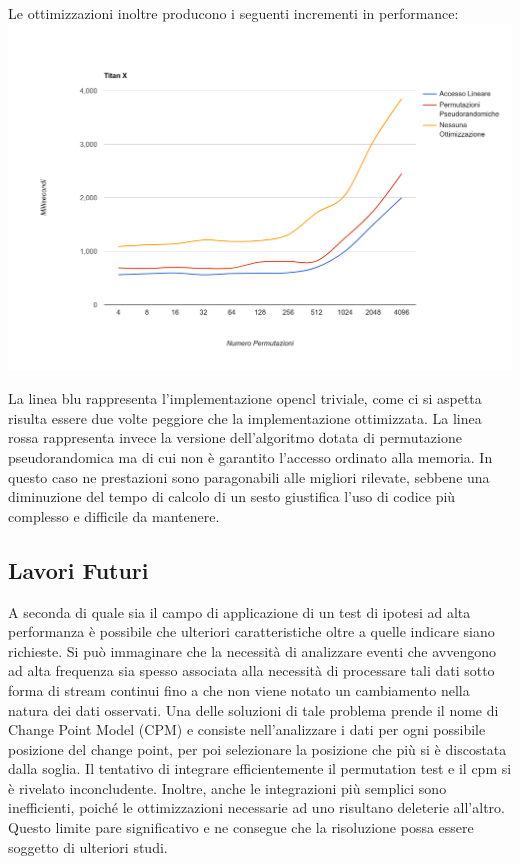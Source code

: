 Le ottimizzazioni inoltre producono i seguenti incrementi in performance:
\includegraphics[width=\linewidth]{ott}

La linea blu rappresenta l'implementazione opencl triviale, come ci si aspetta risulta essere due volte peggiore che la implementazione ottimizzata. La linea rossa rappresenta invece la versione dell'algoritmo dotata di permutazione pseudorandomica ma di cui non è garantito l'accesso ordinato alla memoria. In questo caso ne prestazioni sono paragonabili alle migliori rilevate, sebbene una diminuzione del tempo di calcolo di un sesto giustifica l'uso di codice più complesso e difficile da mantenere.

\subsection{Lavori Futuri}
A seconda di quale sia il campo di applicazione di un test di ipotesi ad alta performanza è possibile che ulteriori caratteristiche oltre a quelle indicare siano richieste. Si può immaginare che la necessità di analizzare eventi che avvengono ad alta frequenza sia spesso associata alla necessità di processare tali dati sotto forma di stream continui fino a che non viene notato un cambiamento nella natura dei dati osservati.
Una delle soluzioni di tale problema prende il nome di Change Point Model (CPM) e consiste nell'analizzare i dati per ogni possibile posizione del change point, per poi selezionare la posizione che più si è discostata dalla soglia. Il tentativo di integrare efficientemente il permutation test e il cpm si è rivelato inconcludente. Inoltre, anche le integrazioni più semplici sono inefficienti, poiché le ottimizzazioni necessarie ad uno risultano deleterie all'altro. Questo limite pare significativo e ne consegue che la risoluzione possa essere soggetto di ulteriori studi.